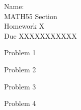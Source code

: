\documentclass[10pt]{article}
\begin{document}
\begin{flushright}
	Name: \underline{\hspace{3cm}} \\
	MATH55 Section \underline{\hspace{0.5cm}} \\
	Homework X \\
	Due XXXXXXXXXXX
\end{flushright}

\begin{framed}
	Problem 1
\end{framed}

\pagebreak

\begin{framed}
	Problem 2
\end{framed}

\pagebreak

\begin{framed}
	Problem 3
\end{framed}

\pagebreak

\begin{framed}
	Problem 4
\end{framed}
\end{document}
